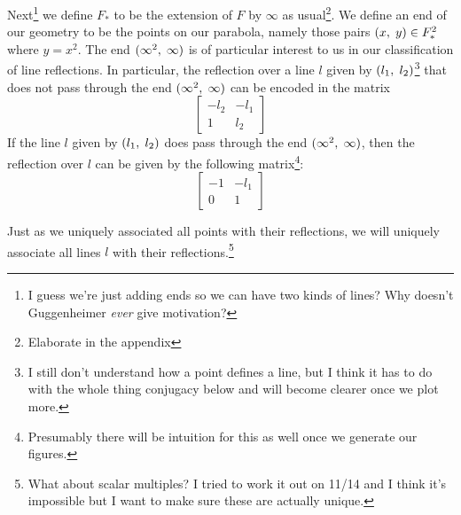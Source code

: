 \documentclass[12pt]{article}
\newcommand{\ttc}{, \hspace{1mm}}
\newcommand{\linenoendmat}[2]{\begin{bmatrix} -{#2} & -{#1} \\ 1 & {#2} \end{bmatrix}}
\newcommand{\stanlinenoendmat}{\linenoendmat{l_1}{l_2}}
\newcommand{\lineendmat}[2]{\begin{bmatrix} -1 & -{#1} \\ 0 & 1 \end{bmatrix}}
\newcommand{\stanlineendmat}{\lineendmat{l_1}{l_2}}
\newcommand{\specialend}{(\infty^2\ttc\infty)}
\theoremstyle{plain}
\theoremstyle{definition}
\begin{document}
Next\footnote{I guess we're just adding ends so we can have two kinds of lines? Why doesn't Guggenheimer \textit{ever} give motivation?} we define $F_*$ to be the extension of $F$ by $\infty$ as usual\footnote{Elaborate in the appendix}. We define an end of our geometry to be the points on our parabola, namely those pairs $(x \ttc y) \in F_*^2$ where $y = x^2$. The end $\specialend$ is of particular interest to us in our classification of line reflections. In particular, the reflection over a line $l$ given by $(l_1\ttc l_2)$\footnote{I still don't understand how a point defines a line, but I think it has to do with the whole thing conjugacy below and will become clearer once we plot more.} that does not pass through the end $\specialend$ can be encoded in the matrix
\[\stanlinenoendmat\]
If the line $l$ given by $(l_1\ttc l_2)$ does pass through the end $\specialend$, then the reflection over $l$ can be given by the following matrix\footnote{Presumably there will be intuition for this as well once we generate our figures.}:
\[
	\stanlineendmat
\]

Just as we uniquely associated all points with their reflections, we will uniquely associate all lines $l$ with their reflections.\footnote{What about scalar multiples? I tried to work it out on 11/14 and I think it's impossible  but I want to make sure these are actually unique.} 
\end{document}
